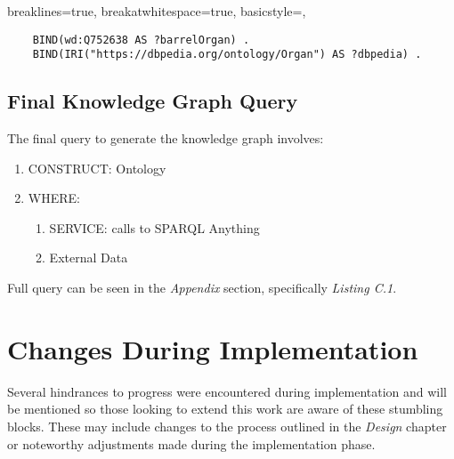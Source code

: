 \lstset
{
    breaklines=true,
    breakatwhitespace=true,
    basicstyle=\linespread{1.5}\ttfamily,
}
\begin{lstlisting}
    BIND(wd:Q752638 AS ?barrelOrgan) . 
    BIND(IRI("https://dbpedia.org/ontology/Organ") AS ?dbpedia) .
\end{lstlisting}

\subsection{Final Knowledge Graph Query}
\hspace*{0.5cm} The final query to generate the knowledge graph involves: 

\begin{enumerate}
    \item CONSTRUCT: Ontology
    \item WHERE:
    \begin{enumerate}
        \vspace{-0.25cm}
        \item SERVICE: calls to SPARQL Anything
        \item External Data
    \end{enumerate}
\end{enumerate}

Full query can be seen in the \textit{Appendix} section, specifically \textit{Listing C.1}. 

\section{Changes During Implementation}
\hspace{0.5cm} Several hindrances to progress were encountered during implementation and will be mentioned so those looking to extend this work are aware of these stumbling blocks. These may include changes to the process outlined in the \textit{Design} chapter or noteworthy adjustments made during the implementation phase.

